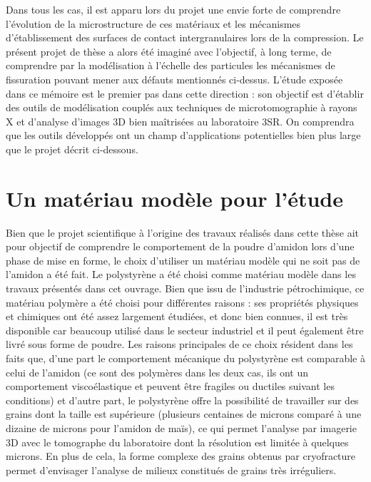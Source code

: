 Dans tous les cas, il est apparu lors du projet une envie forte de comprendre l'évolution de la microstructure de ces matériaux et les mécanismes d'établissement des surfaces de contact intergranulaires lors de la compression. Le présent projet de thèse a alors été imaginé avec l'objectif, à long terme, de comprendre par la modélisation à l'échelle des particules les mécanismes de fissuration pouvant mener aux défauts mentionnés ci-dessus. L'étude exposée dans ce mémoire est le premier pas dans cette direction : son objectif est d'établir des outils de modélisation couplés aux techniques de microtomographie à rayons X et d'analyse d'images 3D bien maîtrisées au laboratoire 3SR. On comprendra que les outils développés ont un champ d'applications potentielles bien plus large que le projet décrit ci-dessous.

\section*{Un matériau modèle pour l'étude}
Bien que le projet scientifique à l'origine des travaux réalisés dans cette thèse ait pour objectif de comprendre le comportement de la poudre d'amidon lors d'une phase de mise en forme, le choix d'utiliser un matériau modèle qui ne soit pas de l'amidon a été fait. Le polystyrène a été choisi comme matériau modèle dans les travaux présentés dans cet ouvrage. Bien que issu de l'industrie pétrochimique, ce matériau polymère a été choisi pour différentes raisons : ses propriétés physiques et chimiques ont été assez largement étudiées, et donc bien connues, il est très disponible car beaucoup utilisé dans le secteur industriel et il peut également être livré sous forme de poudre. Les raisons principales de ce choix résident dans les faits que, d'une part le comportement mécanique du polystyrène est comparable à celui de l'amidon (ce sont des polymères dans les deux cas, ils ont un comportement viscoélastique et peuvent être fragiles ou ductiles suivant les conditions) et d'autre part, le polystyrène offre la possibilité de travailler sur des grains dont la taille est supérieure (plusieurs centaines de microns comparé à une dizaine de microns pour l'amidon de maïs), ce qui permet l'analyse par imagerie 3D avec le tomographe du laboratoire dont la résolution est limitée à quelques microns. En plus de cela, la forme complexe des grains obtenus par cryofracture permet d'envisager l'analyse de milieux constitués de grains très irréguliers.

